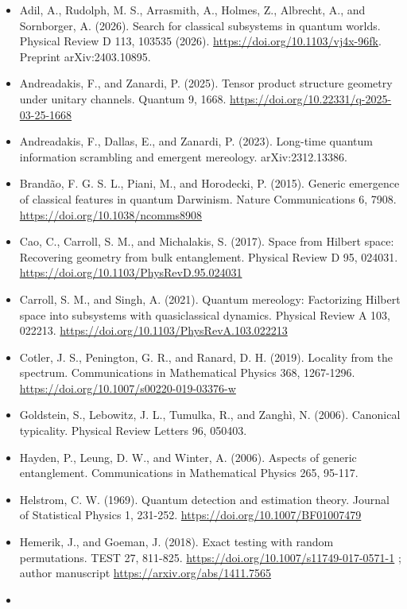 \documentclass[
  10pt,
  a4paper,
]{article}
\providecommand{\tightlist}{%
  \setlength{\itemsep}{0pt}\setlength{\parskip}{0pt}}
\begin{document}
\begin{itemize}
\tightlist
\item
  Adil, A., Rudolph, M. S., Arrasmith, A., Holmes, Z., Albrecht, A., and
  Sornborger, A. (2026). Search for classical subsystems in quantum
  worlds. Physical Review D 113, 103535 (2026).
  \url{https://doi.org/10.1103/vj4x-96fk}. Preprint arXiv:2403.10895.
\item
  Andreadakis, F., and Zanardi, P. (2025). Tensor product structure
  geometry under unitary channels. Quantum 9, 1668.
  \url{https://doi.org/10.22331/q-2025-03-25-1668}
\item
  Andreadakis, F., Dallas, E., and Zanardi, P. (2023). Long-time quantum
  information scrambling and emergent mereology. arXiv:2312.13386.
\item
  Brandão, F. G. S. L., Piani, M., and Horodecki, P. (2015). Generic
  emergence of classical features in quantum Darwinism. Nature
  Communications 6, 7908. \url{https://doi.org/10.1038/ncomms8908}
\item
  Cao, C., Carroll, S. M., and Michalakis, S. (2017). Space from Hilbert
  space: Recovering geometry from bulk entanglement. Physical Review D
  95, 024031. \url{https://doi.org/10.1103/PhysRevD.95.024031}
\item
  Carroll, S. M., and Singh, A. (2021). Quantum mereology: Factorizing
  Hilbert space into subsystems with quasiclassical dynamics. Physical
  Review A 103, 022213.
  \url{https://doi.org/10.1103/PhysRevA.103.022213}
\item
  Cotler, J. S., Penington, G. R., and Ranard, D. H. (2019). Locality
  from the spectrum. Communications in Mathematical Physics 368,
  1267-1296. \url{https://doi.org/10.1007/s00220-019-03376-w}
\item
  Goldstein, S., Lebowitz, J. L., Tumulka, R., and Zanghì, N. (2006).
  Canonical typicality. Physical Review Letters 96, 050403.
\item
  Hayden, P., Leung, D. W., and Winter, A. (2006). Aspects of generic
  entanglement. Communications in Mathematical Physics 265, 95-117.
\item
  Helstrom, C. W. (1969). Quantum detection and estimation theory.
  Journal of Statistical Physics 1, 231-252.
  \url{https://doi.org/10.1007/BF01007479}
\item
  Hemerik, J., and Goeman, J. (2018). Exact testing with random
  permutations. TEST 27, 811-825.
  \url{https://doi.org/10.1007/s11749-017-0571-1} ; author manuscript
  \url{https://arxiv.org/abs/1411.7565}
\item

\end{itemize}
\end{document}
